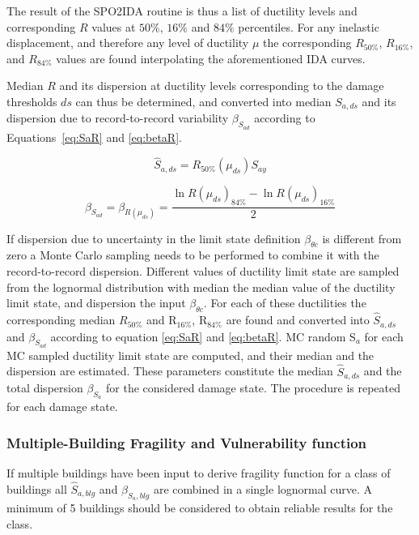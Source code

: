 The result of the SPO2IDA routine is thus a list of ductility levels and corresponding $R$ values at $50\%$, $16\%$ and $84\%$ percentiles. For any inelastic displacement, and therefore any level of ductility $\mu$ the corresponding $R_{50\%}$, $R_{16\%}$, and $R_{84\%}$ values are found interpolating the aforementioned IDA curves.

Median $R$ and its dispersion at ductility levels corresponding to the damage thresholds $ds$ can thus be determined, and converted into median $S_{a, ds}$ and its dispersion due to record-to-record variability $\beta_{S_{a d}}$ according to Equations~\ref{eq:SaR} and \ref{eq:betaR}.

\begin{equation}
	\hat{S}_{a, ds} = R_{50\%}(\mu_{ds}) S_{ay}
	\label{eq:SaR}
\end{equation}

\begin{equation}
	\beta_{S_{a d}} = \beta_{R(\mu_{ds})} = \frac{\ln R(\mu_{ds})_{84\%} - \ln R(\mu_{ds})_{16\%}}{2}
	\label{eq:betaR}
\end{equation}

If dispersion due to uncertainty in the limit state definition $\beta_{\theta c}$ is different from zero a Monte Carlo sampling needs to be performed to combine it with the record-to-record dispersion. Different values of ductility limit state are sampled from the  lognormal distribution with median the median value of the ductility limit state, and dispersion the input $\beta_{\theta c}$. For each of these ductilities the corresponding median $R_{50\%}$ and R$_{16\%}$, R$_{84\%}$ are found and converted into $\hat{S}_{a,ds}$ and $\beta_{S_{a d}}$ according to equation \ref{eq:SaR} and \ref{eq:betaR}. MC random S$_a$ for each MC sampled ductility limit state are computed, and their median and the dispersion are estimated. These parameters constitute the median $\hat{S}_{a,ds}$ and the total dispersion $\beta_{S_a}$ for the considered damage state. The procedure is repeated for each damage state.

\subsubsection{Multiple-Building Fragility and Vulnerability function}
\label{subsubsec:multiple-buildings}
If multiple buildings have been input to derive fragility function for a class of buildings all $\hat{S}_{a, blg}$ and $\beta_{S_a, blg}$ are combined in a single lognormal curve. A minimum of 5 buildings should be considered to obtain reliable results for the class.\\

